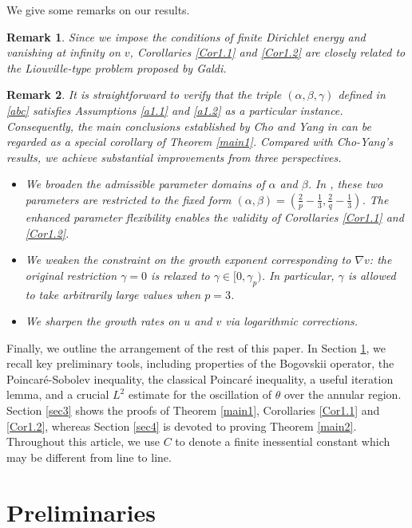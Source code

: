 \documentclass[11pt,reqno]{amsart}
\newtheorem{Rem}{Remark}[section]
\def\v{\vskip}
\numberwithin{Thm}{section}
\begin{document}
We give some remarks on our results.
\begin{Rem}
Since we impose the conditions of finite Dirichlet energy and vanishing at infinity on $v$, Corollaries \ref{Cor1.1} and \ref{Cor1.2} are closely related to the Liouville-type problem proposed by Galdi.
\end{Rem}

\begin{Rem}
It is straightforward to verify that the triple \((\alpha,\beta,\gamma)\) defined in \eqref{abc} satisfies Assumptions \ref{a1.1} and \ref{a1.2} as a particular instance.
Consequently, the main conclusions established by Cho and Yang in \cite{CY26} can be regarded as a special corollary of Theorem \ref{main1}.
Compared with Cho-Yang's results, we achieve substantial improvements from three perspectives.
\begin{itemize}
\item[(i)] We broaden the admissible parameter domains of \(\alpha\) and \(\beta\). In \cite{CY26}, these two parameters are restricted to the fixed form \((\alpha,\beta)=\left(\frac{2}{p}-\frac{1}{3},\frac{2}{q}-\frac{1}{3}\right)\). The enhanced parameter flexibility enables the validity of Corollaries \ref{Cor1.1} and \ref{Cor1.2}.
\item[(ii)] We weaken the constraint on the growth exponent corresponding to \(\nabla v\): the original restriction \(\gamma=0\) is relaxed to \(\gamma\in[0,\gamma_p)\). In particular, \(\gamma\) is allowed to take arbitrarily large values when \(p=3\).
\item[(iii)] We sharpen the growth rates on $u$ and $v$ via logarithmic corrections.
\end{itemize}
\end{Rem}

Finally, we outline the arrangement of the rest of this paper. In Section \ref{sec2}, we recall key preliminary tools, including properties of the Bogovskii operator, the Poincar\'{e}-Sobolev inequality, the classical Poincar\'{e} inequality, a useful iteration lemma, and a crucial $L^2$ estimate for the oscillation of $\theta$ over the annular region. Section \ref{sec3} shows the proofs of Theorem \ref{main1}, Corollaries \ref{Cor1.1} and \ref{Cor1.2}, whereas Section \ref{sec4} is devoted to proving Theorem \ref{main2}.
Throughout this article, we use $C$ to denote a finite inessential constant which may be different from line to line.
\v0.1in
\section{Preliminaries}\label{sec2}
\end{document}
